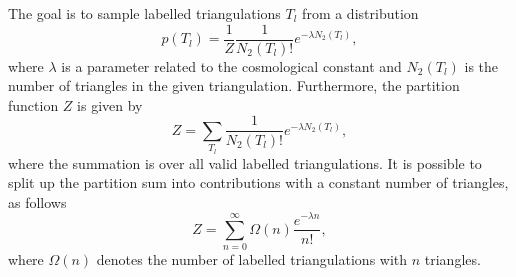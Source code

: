The goal is to sample labelled triangulations $T_l$ from a distribution
\begin{equation}\label{eq:full_dist}
    p (T_l)
    =
    \frac{1}{Z} \frac{1}{N_2(T_l)!} e^{- \lambda N_2(T_l)}
    ,
\end{equation}
where $\lambda$ is a parameter related to the cosmological constant and $N_2(T_l)$ is the number of triangles in the given triangulation. Furthermore, the partition function $Z$ is given by
\begin{equation}
    Z
    =
    \sum_{T_l} \frac{1}{N_2(T_l)!} e^{- \lambda N_2(T_l)}
    ,
\end{equation}
where the summation is over all valid labelled triangulations. It is possible to split up the partition sum into contributions with a constant number of triangles, as follows
\begin{equation}
    Z
    =
    \sum_{n = 0}^\infty \Omega(n) \frac{e^{- \lambda n}}{n!}
    ,
\end{equation}
where $\Omega(n)$ denotes the number of labelled triangulations with $n$ triangles.

